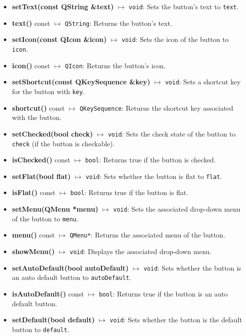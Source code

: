 \documentclass{report}
\begin{document}
    \pagebreak 
    \begin{itemize}
        \item \textbf{setText(const QString \&text)} $\mapsto$ \texttt{void}: Sets the button's text to \texttt{text}.
        \item \textbf{text()} const $\mapsto$ \texttt{QString}: Returns the button's text.
        \item \textbf{setIcon(const QIcon \&icon)} $\mapsto$ \texttt{void}: Sets the icon of the button to \texttt{icon}.
        \item \textbf{icon()} const $\mapsto$ \texttt{QIcon}: Returns the button's icon.
        \item \textbf{setShortcut(const QKeySequence \&key)} $\mapsto$ \texttt{void}: Sets a shortcut key for the button with \texttt{key}.
        \item \textbf{shortcut()} const $\mapsto$ \texttt{QKeySequence}: Returns the shortcut key associated with the button.
        \item \textbf{setChecked(bool check)} $\mapsto$ \texttt{void}: Sets the check state of the button to \texttt{check} (if the button is checkable).
        \item \textbf{isChecked()} const $\mapsto$ \texttt{bool}: Returns true if the button is checked.
        \item \textbf{setFlat(bool flat)} $\mapsto$ \texttt{void}: Sets whether the button is flat to \texttt{flat}.
        \item \textbf{isFlat()} const $\mapsto$ \texttt{bool}: Returns true if the button is flat.
        \item \textbf{setMenu(QMenu *menu)} $\mapsto$ \texttt{void}: Sets the associated drop-down menu of the button to \texttt{menu}.
        \item \textbf{menu()} const $\mapsto$ \texttt{QMenu*}: Returns the associated menu of the button.
        \item \textbf{showMenu()} $\mapsto$ \texttt{void}: Displays the associated drop-down menu.
        \item \textbf{setAutoDefault(bool autoDefault)} $\mapsto$ \texttt{void}: Sets whether the button is an auto default button to \texttt{autoDefault}.
        \item \textbf{isAutoDefault()} const $\mapsto$ \texttt{bool}: Returns true if the button is an auto default button.
        \item \textbf{setDefault(bool default)} $\mapsto$ \texttt{void}: Sets whether the button is the default button to \texttt{default}.

\end{itemize}
\end{document}
